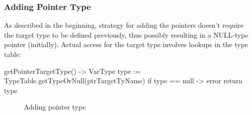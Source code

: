 \subsubsection{Adding Pointer Type}
As described in the beginning, strategy for adding the pointers doesn't require the target type to be defined
previously, thus possibly resulting in a NULL-type pointer (initially).
Actual access for the target type involves lookups in the type table:
\begin{codeblock}
    getPointerTargetType() -> VarType {
        type := TypeTable.getTypeOrNull(ptrTargetTyName)
        if type == null -> { error }
        return type
    }
\end{codeblock}
\begin{figure}[h]
    \centering
    \caption{Adding pointer type}
    \label{fig:addPointer}
\end{figure}

